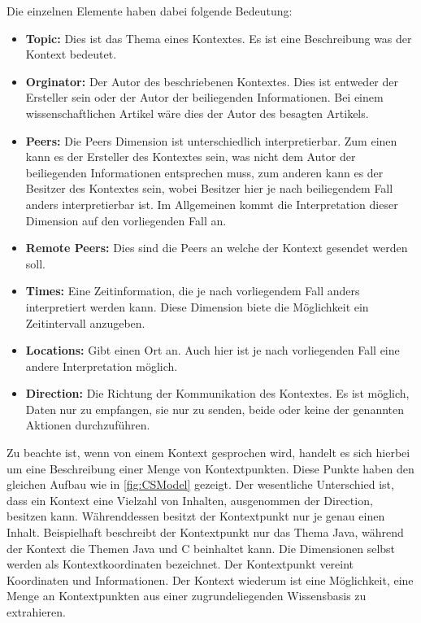 \documentclass[a4paper]{article}
\begin{document}
	Die einzelnen Elemente haben dabei folgende Bedeutung:
	\begin{itemize}
		\item \textbf{Topic:} Dies ist das Thema eines Kontextes. Es ist eine
		Beschreibung was der Kontext bedeutet.
		\newpage
		\item \textbf{Orginator:} Der Autor des beschriebenen Kontextes. Dies
		ist entweder der Ersteller sein oder der Autor der beiliegenden
		Informationen. Bei einem wissenschaftlichen Artikel wäre dies der Autor
		des besagten Artikels.
		\item \textbf{Peers:} Die Peers Dimension ist unterschiedlich 		
		interpretierbar. Zum einen kann es der Ersteller des Kontextes sein,
		was nicht dem Autor der beiliegenden Informationen entsprechen muss,
		zum anderen kann es	der Besitzer des Kontextes sein, wobei Besitzer hier
		je nach beiliegendem Fall anders interpretierbar ist. Im Allgemeinen
		kommt die Interpretation dieser Dimension auf den vorliegenden Fall an.
		\item \textbf{Remote Peers:} Dies sind die Peers an welche der Kontext
		gesendet werden soll.
		\item \textbf{Times:} Eine Zeitinformation, die je nach vorliegendem Fall
		anders interpretiert werden kann. Diese Dimension biete die Möglichkeit
		ein Zeitintervall anzugeben.
		\item \textbf{Locations:} Gibt einen Ort an. Auch hier ist je nach 
		vorliegenden Fall eine andere Interpretation möglich.
		\item \textbf{Direction:} Die Richtung der Kommunikation des Kontextes.
		Es ist möglich, Daten nur zu empfangen, sie nur zu senden, beide oder keine
		der genannten Aktionen durchzuführen.
	\end{itemize} 	
	
	Zu beachte ist, wenn von einem Kontext gesprochen wird, handelt es
	sich hierbei um eine Beschreibung einer Menge von Kontextpunkten. Diese
	Punkte haben den gleichen Aufbau wie in \autoref{fig:CSModel} gezeigt. Der 
	wesentliche Unterschied ist, dass ein Kontext eine Vielzahl von Inhalten,
	ausgenommen der Direction, besitzen kann. Währenddessen besitzt der
	Kontextpunkt nur je genau einen Inhalt. Beispielhaft beschreibt der
	Kontextpunkt nur das Thema Java, während der Kontext die Themen Java und C 
	beinhaltet kann. Die Dimensionen selbst werden als Kontextkoordinaten bezeichnet.
	Der Kontextpunkt vereint Koordinaten und Informationen. Der Kontext wiederum
	ist eine Möglichkeit, eine Menge an Kontextpunkten aus einer zugrundeliegenden
	Wissensbasis zu extrahieren.
	
\end{document}
